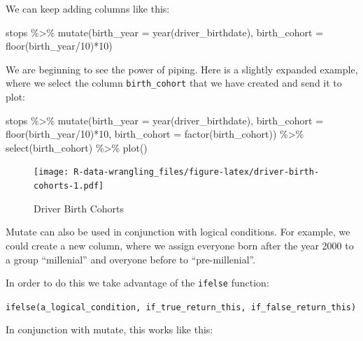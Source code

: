 \documentclass[
]{book}
\newenvironment{Shaded}{\begin{snugshade}}{\end{snugshade}}
\newcommand{\AttributeTok}[1]{\textcolor[rgb]{0.77,0.63,0.00}{#1}}
\newcommand{\DecValTok}[1]{\textcolor[rgb]{0.00,0.00,0.81}{#1}}
\newcommand{\FunctionTok}[1]{\textcolor[rgb]{0.00,0.00,0.00}{#1}}
\newcommand{\NormalTok}[1]{#1}
\newcommand{\SpecialCharTok}[1]{\textcolor[rgb]{0.00,0.00,0.00}{#1}}
\begin{document}
We can keep adding columns like this:

\begin{Shaded}
\begin{Highlighting}[]
\NormalTok{stops }\SpecialCharTok{\%\textgreater{}\%} 
  \FunctionTok{mutate}\NormalTok{(}\AttributeTok{birth\_year =} \FunctionTok{year}\NormalTok{(driver\_birthdate),}
         \AttributeTok{birth\_cohort =} \FunctionTok{floor}\NormalTok{(birth\_year}\SpecialCharTok{/}\DecValTok{10}\NormalTok{)}\SpecialCharTok{*}\DecValTok{10}\NormalTok{) }
\end{Highlighting}
\end{Shaded}

We are beginning to see the power of piping. Here is a slightly expanded example, where we select the column \texttt{birth\_cohort} that we have created and send it to plot:

\begin{Shaded}
\begin{Highlighting}[]
\NormalTok{stops }\SpecialCharTok{\%\textgreater{}\%} 
  \FunctionTok{mutate}\NormalTok{(}\AttributeTok{birth\_year =} \FunctionTok{year}\NormalTok{(driver\_birthdate),}
         \AttributeTok{birth\_cohort =} \FunctionTok{floor}\NormalTok{(birth\_year}\SpecialCharTok{/}\DecValTok{10}\NormalTok{)}\SpecialCharTok{*}\DecValTok{10}\NormalTok{,}
         \AttributeTok{birth\_cohort =} \FunctionTok{factor}\NormalTok{(birth\_cohort)) }\SpecialCharTok{\%\textgreater{}\%}
    \FunctionTok{select}\NormalTok{(birth\_cohort) }\SpecialCharTok{\%\textgreater{}\%} 
    \FunctionTok{plot}\NormalTok{()}
\end{Highlighting}
\end{Shaded}

\begin{figure}
\centering
\texttt{[image: R-data-wrangling\_files/figure-latex/driver-birth-cohorts-1.pdf]}
\caption{\label{fig:driver-birth-cohorts}Driver Birth Cohorts}
\end{figure}

Mutate can also be used in conjunction with logical conditions. For example, we could create a new column, where we assign everyone born after the year 2000 to a group ``millenial'' and overyone before to ``pre-millenial''.

In order to do this we take advantage of the \texttt{ifelse} function:

\texttt{ifelse(a\_logical\_condition,\ if\_true\_return\_this,\ if\_false\_return\_this)}

In conjunction with mutate, this works like this:
\end{document}
